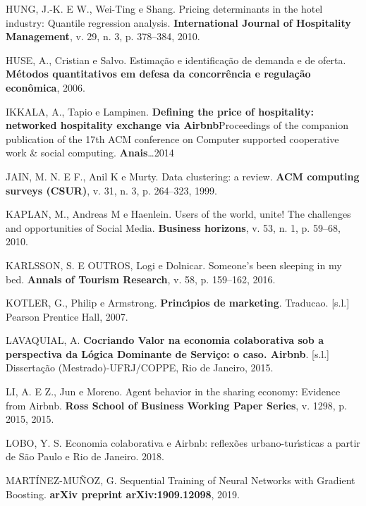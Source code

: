 \documentclass[
	12pt,				%
	a4paper,		%
	oneside,    %
	chapter=TITLE,		   %
	section=TITLE,		   %
	subsection=TITLE,	   %
	subsubsection=TITLE, %
	english,			%
	french,				%
	spanish,			%
	brazil,				%
]{abntex2}
\begin{document}
\leavevmode\hypertarget{ref-hung2010pricing}{}%
HUNG, J.-K. E W., Wei-Ting e Shang. Pricing determinants in the hotel
industry: Quantile regression analysis. \textbf{International Journal of
Hospitality Management}, v. 29, n. 3, p. 378--384, 2010.

\leavevmode\hypertarget{ref-huse2006estimaccao}{}%
HUSE, A., Cristian e Salvo. Estimação e identificação de demanda e de
oferta. \textbf{Métodos quantitativos em defesa da concorrência e
regulação econômica}, 2006.

\leavevmode\hypertarget{ref-ikkala2014defining}{}%
IKKALA, A., Tapio e Lampinen. \textbf{Defining the price of hospitality:
networked hospitality exchange via Airbnb}Proceedings of the companion
publication of the 17th ACM conference on Computer supported cooperative
work \& social computing. \textbf{Anais}\ldots2014

\leavevmode\hypertarget{ref-jain1999data}{}%
JAIN, M. N. E F., Anil K e Murty. Data clustering: a review. \textbf{ACM
computing surveys (CSUR)}, v. 31, n. 3, p. 264--323, 1999.

\leavevmode\hypertarget{ref-kaplan2010users}{}%
KAPLAN, M., Andreas M e Haenlein. Users of the world, unite! The
challenges and opportunities of Social Media. \textbf{Business
horizons}, v. 53, n. 1, p. 59--68, 2010.

\leavevmode\hypertarget{ref-karlsson2016someone}{}%
KARLSSON, S. E OUTROS, Logi e Dolnicar. Someone's been sleeping in my
bed. \textbf{Annals of Tourism Research}, v. 58, p. 159--162, 2016.

\leavevmode\hypertarget{ref-kotler2007principios}{}%
KOTLER, G., Philip e Armstrong. \textbf{Princı́pios de marketing}.
Traducao. {[}s.l.{]} Pearson Prentice Hall, 2007.

\leavevmode\hypertarget{ref-lavaquial2015cocriando}{}%
LAVAQUIAL, A. \textbf{Cocriando Valor na economia colaborativa sob a
perspectiva da Lógica Dominante de Serviço: o caso. Airbnb}. {[}s.l.{]}
Dissertação (Mestrado)-UFRJ/COPPE, Rio de Janeiro, 2015.

\leavevmode\hypertarget{ref-li2015agent}{}%
LI, A. E Z., Jun e Moreno. Agent behavior in the sharing economy:
Evidence from Airbnb. \textbf{Ross School of Business Working Paper
Series}, v. 1298, p. 2015, 2015.

\leavevmode\hypertarget{ref-loboeconomia}{}%
LOBO, Y. S. Economia colaborativa e Airbnb: reflexões urbano-turı́sticas
a partir de São Paulo e Rio de Janeiro. 2018.

\leavevmode\hypertarget{ref-martinez2019sequential}{}%
MARTÍNEZ-MUÑOZ, G. Sequential Training of Neural Networks with Gradient
Boosting. \textbf{arXiv preprint arXiv:1909.12098}, 2019.
\end{document}

